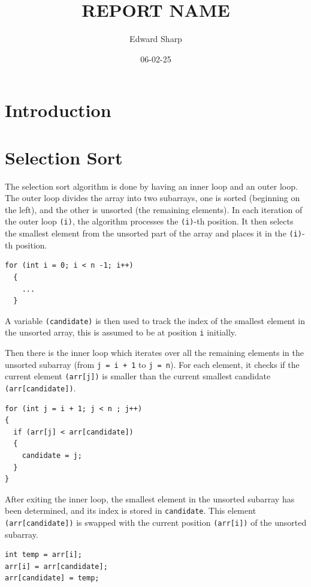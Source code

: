 \documentclass[a4paper,11pt]{article}
\begin{document}
\title{
    \textbf{REPORT NAME}
}
\author{Edward Sharp}
\date{06-02-25}

\maketitle

\section*{Introduction}

\section*{Selection Sort}

The selection sort algorithm is done by having an inner loop and an outer loop.
The outer loop divides the array into two subarrays, one is sorted (beginning on the left),
and the other is unsorted (the remaining elements).
In each iteration of the outer loop \texttt{(i)}, the algorithm processes the \texttt{(i)}-th position.
It then selects the smallest element from the unsorted part of the array and places it in the \texttt{(i)}-th position.

\begin{verbatim}
for (int i = 0; i < n -1; i++)
  {
    ...
  }
\end{verbatim}

A variable \texttt{(candidate)} is then used to track the index of the smallest element in the unsorted array,
this is assumed to be at position \texttt{i} initially.

Then there is the inner loop which iterates over all the remaining elements in the unsorted subarray (from \texttt{j = i + 1} to \texttt{j = n}).
For each element, it checks if the current element \texttt{(arr[j])} is smaller than the current smallest candidate \texttt{(arr[candidate])}.

\begin{verbatim}
for (int j = i + 1; j < n ; j++)
{
  if (arr[j] < arr[candidate])
  {
    candidate = j;
  }
}
\end{verbatim}

After exiting the inner loop, the smallest element in the unsorted subarray has been determined,
and its index is stored in \texttt{candidate}.
This element \texttt{(arr[candidate])} is swapped with the current position \texttt{(arr[i])} of the unsorted subarray.

\begin{verbatim}
int temp = arr[i];
arr[i] = arr[candidate];
arr[candidate] = temp;
\end{verbatim}
\end{document}
